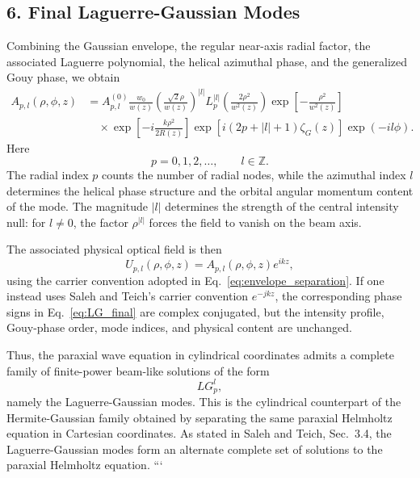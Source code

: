 \begin{resolucao}[Solution]
\subsection*{6. Final Laguerre-Gaussian Modes}

    Combining the Gaussian envelope, the regular near-axis radial factor, the associated Laguerre polynomial, the helical azimuthal phase, and the generalized Gouy phase, we obtain
    \begin{equation}
        \boxed{
        \begin{aligned}
        A_{p,l}(\rho,\phi,z)
        &=
        A_{p,l}^{(0)}
        \frac{w_0}{w(z)}
        \left(
            \frac{\sqrt{2}\rho}{w(z)}
        \right)^{|l|}
        L_p^{|l|}
        \left(
            \frac{2\rho^2}{w^2(z)}
        \right)
        \exp\left[
            -\frac{\rho^2}{w^2(z)}
        \right]
        \\[4pt]
        &\quad\times
        \exp\left[
            -i\frac{k\rho^2}{2R(z)}
        \right]
        \exp\left[
            i(2p+|l|+1)
            \zeta_G(z)
        \right]
        \exp(-il\phi).
        \end{aligned}
        }
        \label{eq:LG_final}
    \end{equation}
    Here
    \[
        p=0,1,2,\ldots,
        \qquad
        l\in\mathbb{Z}.
    \]
    The radial index $p$ counts the number of radial nodes, while the azimuthal index $l$ determines the helical phase structure and the orbital angular momentum content of the mode. The magnitude $|l|$ determines the strength of the central intensity null: for $l\neq0$, the factor $\rho^{|l|}$ forces the field to vanish on the beam axis.

    The associated physical optical field is then
    \begin{equation}
        U_{p,l}(\rho,\phi,z)
        =
        A_{p,l}(\rho,\phi,z)e^{ikz},
        \label{eq:LG_total_field}
    \end{equation}
    using the carrier convention adopted in Eq.~\eqref{eq:envelope_separation}. If one instead uses Saleh and Teich's carrier convention $e^{-jkz}$, the corresponding phase signs in Eq.~\eqref{eq:LG_final} are complex conjugated, but the intensity profile, Gouy-phase order, mode indices, and physical content are unchanged.

    Thus, the paraxial wave equation in cylindrical coordinates admits a complete family of finite-power beam-like solutions of the form
    \[
        LG_p^l,
    \]
    namely the Laguerre-Gaussian modes. This is the cylindrical counterpart of the Hermite-Gaussian family obtained by separating the same paraxial Helmholtz equation in Cartesian coordinates. As stated in Saleh and Teich, Sec.~3.4, the Laguerre-Gaussian modes form an alternate complete set of solutions to the paraxial Helmholtz equation.
```

\end{resolucao}
